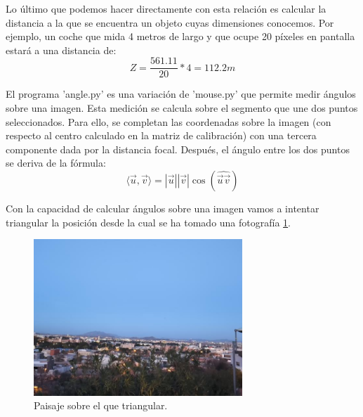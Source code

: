\documentclass[12pt]{article}
\begin{document}
Lo último que podemos hacer directamente con esta relación es calcular la distancia a la que se encuentra un objeto cuyas dimensiones conocemos. Por ejemplo, un coche que mida 4 metros de largo y que ocupe 20 píxeles en pantalla estará a una distancia de:
$$
Z=\frac{561.11}{20}*4=112.2m
$$

El programa 'angle.py' es una variación de 'mouse.py' que permite medir ángulos sobre una imagen. Esta medición se calcula sobre el segmento que une dos puntos seleccionados.
Para ello, se completan las coordenadas sobre la imagen (con respecto al centro calculado en la matriz de calibración) con una tercera componente dada por la distancia focal.
Después, el ángulo entre los dos puntos se deriva de la fórmula:
$$
\langle \vec{u},\vec{v} \rangle = |\vec{u}||\vec{v}| \cos(\widehat{\vec{u}\vec{v}})
$$ 

Con la capacidad de calcular ángulos sobre una imagen vamos a intentar triangular la posición desde la cual se ha tomado una fotografía \ref{fig:paisaje}. 
\begin{figure}[h!]
    \centering
    \includegraphics[width=0.7\textwidth]{images_calibracion/Paisaje.png} 
    \caption{Paisaje sobre el que triangular.}
    \label{fig:paisaje}
\end{figure}
\end{document}

